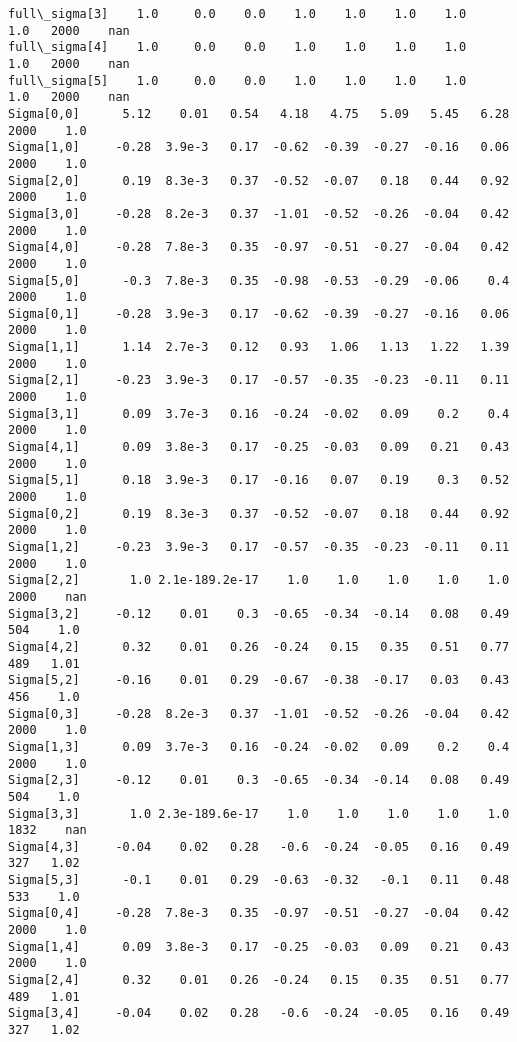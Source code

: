 \documentclass[11pt]{article}
\begin{document}
\begin{Verbatim}[commandchars=\\\{\}]
full\_sigma[3]    1.0     0.0    0.0    1.0    1.0    1.0    1.0    1.0   2000    nan
full\_sigma[4]    1.0     0.0    0.0    1.0    1.0    1.0    1.0    1.0   2000    nan
full\_sigma[5]    1.0     0.0    0.0    1.0    1.0    1.0    1.0    1.0   2000    nan
Sigma[0,0]      5.12    0.01   0.54   4.18   4.75   5.09   5.45   6.28   2000    1.0
Sigma[1,0]     -0.28  3.9e-3   0.17  -0.62  -0.39  -0.27  -0.16   0.06   2000    1.0
Sigma[2,0]      0.19  8.3e-3   0.37  -0.52  -0.07   0.18   0.44   0.92   2000    1.0
Sigma[3,0]     -0.28  8.2e-3   0.37  -1.01  -0.52  -0.26  -0.04   0.42   2000    1.0
Sigma[4,0]     -0.28  7.8e-3   0.35  -0.97  -0.51  -0.27  -0.04   0.42   2000    1.0
Sigma[5,0]      -0.3  7.8e-3   0.35  -0.98  -0.53  -0.29  -0.06    0.4   2000    1.0
Sigma[0,1]     -0.28  3.9e-3   0.17  -0.62  -0.39  -0.27  -0.16   0.06   2000    1.0
Sigma[1,1]      1.14  2.7e-3   0.12   0.93   1.06   1.13   1.22   1.39   2000    1.0
Sigma[2,1]     -0.23  3.9e-3   0.17  -0.57  -0.35  -0.23  -0.11   0.11   2000    1.0
Sigma[3,1]      0.09  3.7e-3   0.16  -0.24  -0.02   0.09    0.2    0.4   2000    1.0
Sigma[4,1]      0.09  3.8e-3   0.17  -0.25  -0.03   0.09   0.21   0.43   2000    1.0
Sigma[5,1]      0.18  3.9e-3   0.17  -0.16   0.07   0.19    0.3   0.52   2000    1.0
Sigma[0,2]      0.19  8.3e-3   0.37  -0.52  -0.07   0.18   0.44   0.92   2000    1.0
Sigma[1,2]     -0.23  3.9e-3   0.17  -0.57  -0.35  -0.23  -0.11   0.11   2000    1.0
Sigma[2,2]       1.0 2.1e-189.2e-17    1.0    1.0    1.0    1.0    1.0   2000    nan
Sigma[3,2]     -0.12    0.01    0.3  -0.65  -0.34  -0.14   0.08   0.49    504    1.0
Sigma[4,2]      0.32    0.01   0.26  -0.24   0.15   0.35   0.51   0.77    489   1.01
Sigma[5,2]     -0.16    0.01   0.29  -0.67  -0.38  -0.17   0.03   0.43    456    1.0
Sigma[0,3]     -0.28  8.2e-3   0.37  -1.01  -0.52  -0.26  -0.04   0.42   2000    1.0
Sigma[1,3]      0.09  3.7e-3   0.16  -0.24  -0.02   0.09    0.2    0.4   2000    1.0
Sigma[2,3]     -0.12    0.01    0.3  -0.65  -0.34  -0.14   0.08   0.49    504    1.0
Sigma[3,3]       1.0 2.3e-189.6e-17    1.0    1.0    1.0    1.0    1.0   1832    nan
Sigma[4,3]     -0.04    0.02   0.28   -0.6  -0.24  -0.05   0.16   0.49    327   1.02
Sigma[5,3]      -0.1    0.01   0.29  -0.63  -0.32   -0.1   0.11   0.48    533    1.0
Sigma[0,4]     -0.28  7.8e-3   0.35  -0.97  -0.51  -0.27  -0.04   0.42   2000    1.0
Sigma[1,4]      0.09  3.8e-3   0.17  -0.25  -0.03   0.09   0.21   0.43   2000    1.0
Sigma[2,4]      0.32    0.01   0.26  -0.24   0.15   0.35   0.51   0.77    489   1.01
Sigma[3,4]     -0.04    0.02   0.28   -0.6  -0.24  -0.05   0.16   0.49    327   1.02

\end{Verbatim}
\end{document}
